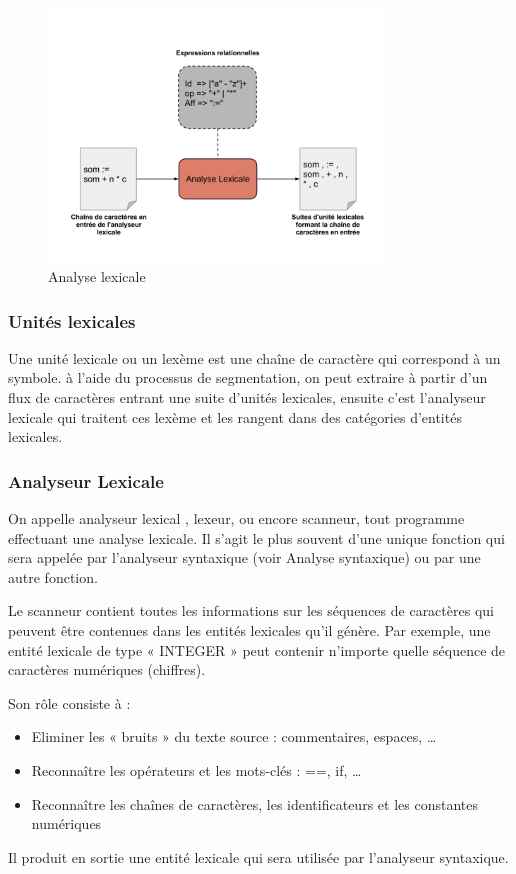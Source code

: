 \documentclass{article}
\begin{document}
\begin{figure}[h]
	\centering
		\includegraphics[width=0.80\textwidth]{AnalyseLexicale.png}
	\caption{Analyse lexicale}
	\label{fig:AnalyseLexicale}
\end{figure}\FloatBarrier


\subsubsection{Unités lexicales}
Une unité lexicale ou un lexème est une chaîne de caractère qui correspond à un symbole. à l’aide du processus de segmentation, on peut extraire à partir d’un flux de caractères entrant une suite d’unités lexicales, ensuite c’est l’analyseur lexicale qui traitent ces lexème et les rangent dans des catégories d’entités lexicales.

\subsubsection{Analyseur Lexicale}

On appelle analyseur lexical \cite{refAnalyseurLexicale}, lexeur, ou encore scanneur, tout programme effectuant une analyse lexicale. Il s'agit le plus souvent d'une unique fonction qui sera appelée par l'analyseur syntaxique (voir Analyse syntaxique) ou par une autre fonction.

Le scanneur contient toutes les informations sur les séquences de caractères qui peuvent être contenues dans les entités lexicales qu'il génère. Par exemple, une entité lexicale de type « INTEGER » peut contenir n'importe quelle séquence de caractères numériques (chiffres).

Son rôle consiste à :
\begin{itemize}
			\item Eliminer les « bruits » du texte source : commentaires, espaces, …
			\item Reconnaître les opérateurs et les mots-clés : ==, if, …
			\item Reconnaître les chaînes de caractères, les identificateurs et les constantes numériques
\end{itemize}
Il produit en sortie une entité lexicale qui sera utilisée par l'analyseur syntaxique.
\end{document}
